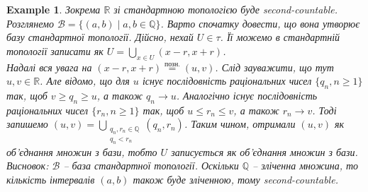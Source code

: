 \documentclass[a4paper, 10pt]{article}
\theoremstyle{theoremdd}
\newtheorem{example}[theorem]{Example}
\begin{document}
\begin{example}
Зокрема $\mathbb{R}$ зі стандартною топологією буде second-countable.\\
Розглянемо $\mathcal{B} = \{ (a,b) \mid a,b \in \mathbb{Q} \}$. Варто спочатку довести, що вона утворює базу стандартної топології. Дійсно, нехай $U \in \tau$. Її можемо в стандартній топології записати як $U = \displaystyle\bigcup_{x \in U} (x-r,x+r)$.\\
Надалі вся увага на $(x-r,x+r) \overset{\text{позн.}}{=} (u,v)$. Слід зауважити, що тут $u,v \in \mathbb{R}$. Але відомо, що для $u$ існує послідовність раціональних чисел $\{q_n, n \geq 1\}$ так, щоб $v \geq q_n \geq u$, а також $q_n \to u$. Аналогічно існує послідовність раціональних чисел $\{r_n, n \geq 1\}$ так, щоб $u \leq r_n \leq v$, а також $r_n \to v$. Тоді запишемо $(u,v) = \displaystyle\bigcup_{\substack{q_n,r_n \in \mathbb{Q} \\ q_n < r_n}} (q_n,r_n)$. Таким чином, отримали $(u,v)$ як об'єднання множин з бази, тобто $U$ записується як об'єднання множин з бази.\\
Висновок: $\mathcal{B}$ -- база стандартної топології. Оскільки $\mathbb{Q}$ -- зліченна множина, то кількість інтервалів $(a,b)$ також буде зліченною, тому second-countable.

\end{example}
\end{document}
